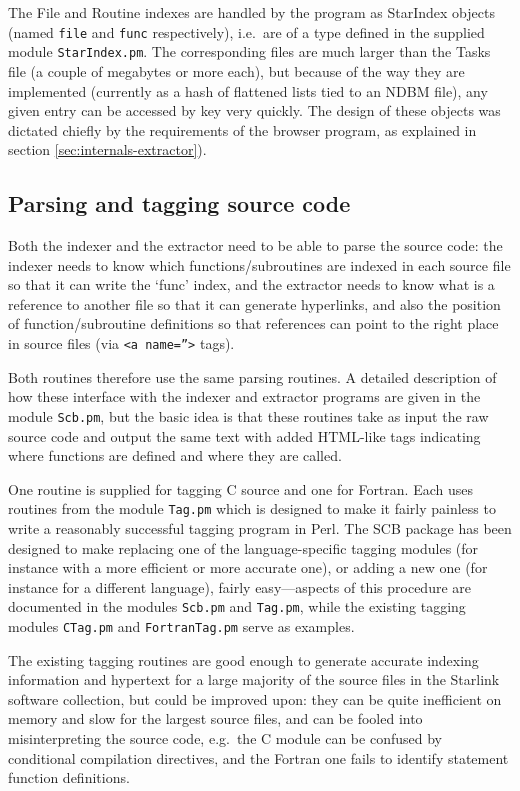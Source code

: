 \documentclass[twoside,11pt]{article}
\newcommand{\xlabel}[1]{}
\renewcommand{\_}{\texttt{\symbol{95}}}
\begin{document}
The File and Routine indexes are
handled by the program as StarIndex 
objects (named {\tt file} and {\tt func} respectively), 
i.e.\ are of a type 
defined in the supplied module {\tt StarIndex.pm}.
The corresponding files are much larger than the Tasks file 
(a couple of megabytes or more each),
but because of the way they are implemented 
(currently as a hash of flattened lists tied to an NDBM file), 
any given entry can be accessed by key very quickly.
The design of these objects was dictated chiefly by the requirements
of the browser program, as explained in 
section \ref{sec:internals-extractor}).



\subsection{\xlabel{sec:internals-tagging}Parsing and tagging source code}

Both the indexer and the extractor need to be able to parse the 
source code: the indexer needs to know which
functions/subroutines are indexed in each source file so that
it can write the `func' index, and the extractor needs to know
what is a reference to another file so that it can generate
hyperlinks, and also the position of function/subroutine 
definitions so that references can point to the right place in
source files (via {\tt <a name=''>} tags).

Both routines therefore use the same parsing routines. 
A detailed description of how these interface with
the indexer and extractor programs are given in the 
module {\tt Scb.pm}, but the basic idea is that these routines
take as input the raw source code and output the same text
with added HTML-like tags indicating where functions are defined 
and where they are called.

One routine is supplied for tagging C source and one for 
Fortran.  
Each uses routines from the module {\tt Tag.pm}
which is designed to make it fairly painless to write a
reasonably successful tagging program in Perl.
The SCB package has been designed to make
replacing one of the language-specific tagging modules 
(for instance with a more efficient or more accurate one),
or adding a new one (for instance for a different language), 
fairly easy---aspects of this 
procedure are documented in the modules {\tt Scb.pm} and {\tt Tag.pm},
while the existing tagging modules {\tt CTag.pm} and {\tt FortranTag.pm}
serve as examples.

The existing tagging routines are good enough to generate 
accurate indexing information and hypertext 
for a large majority of the source files in the
Starlink software collection, but could be improved upon:
they can be quite inefficient on memory and slow
for the largest source files, and can be fooled into misinterpreting
the source code, e.g.\ the C module can be confused by conditional
compilation directives, and the Fortran one fails to identify
statement function definitions.
\end{document}
